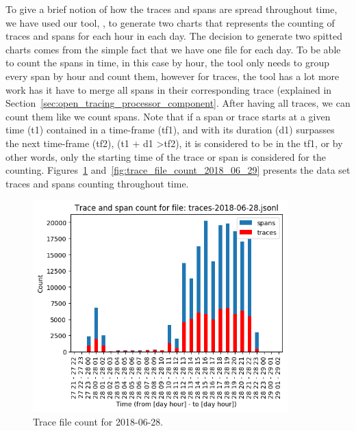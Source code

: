 To give a brief notion of how the traces and spans are spread throughout time, we have used our tool, , to generate two charts that represents the counting of traces and spans for each hour in each day. The decision to generate two spitted charts comes from the simple fact that we have one file for each day. To be able to count the spans in time, in this case by hour, the tool only needs to group every span by hour and count them, however for traces, the tool has a lot more work has it have to merge all spans in their corresponding trace (explained in Section~\ref{sec:open_tracing_processor_component}. After having all traces, we can count them like we count spans. Note that if a span or trace starts at a given time (t1) contained in a time-frame (tf1), and with its duration (d1) surpasses the next time-frame (tf2), (t1 + d1 \textgreater tf2), it is considered to be in the tf1, or by other words, only the starting time of the trace or span is considered for the counting. Figures~\ref{fig:trace_file_count_2018_06_28} and~\ref{fig:trace_file_count_2018_06_29} presents the data set traces and spans counting throughout time.

\begin{figure}[H]
    \centering
    \includegraphics[width=0.88\textwidth]{images/trace_file_count_2018_06_28_chart.png}
    \caption{Trace file count for 2018-06-28.}
    \label{fig:trace_file_count_2018_06_28}
\end{figure}

